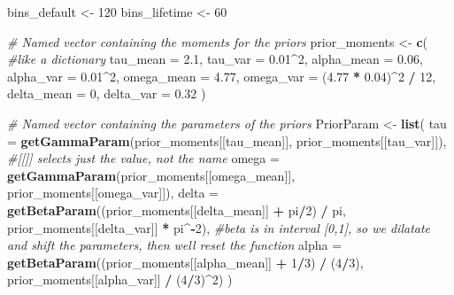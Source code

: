 \documentclass[
]{article}
\newenvironment{Shaded}{\begin{snugshade}}{\end{snugshade}}
\newcommand{\AttributeTok}[1]{\textcolor[rgb]{0.13,0.29,0.53}{#1}}
\newcommand{\CommentTok}[1]{\textcolor[rgb]{0.56,0.35,0.01}{\textit{#1}}}
\newcommand{\DecValTok}[1]{\textcolor[rgb]{0.00,0.00,0.81}{#1}}
\newcommand{\FloatTok}[1]{\textcolor[rgb]{0.00,0.00,0.81}{#1}}
\newcommand{\FunctionTok}[1]{\textcolor[rgb]{0.13,0.29,0.53}{\textbf{#1}}}
\newcommand{\NormalTok}[1]{#1}
\newcommand{\OtherTok}[1]{\textcolor[rgb]{0.56,0.35,0.01}{#1}}
\newcommand{\SpecialCharTok}[1]{\textcolor[rgb]{0.81,0.36,0.00}{\textbf{#1}}}
\newcommand{\StringTok}[1]{\textcolor[rgb]{0.31,0.60,0.02}{#1}}
\begin{document}
\begin{Shaded}
\begin{Highlighting}[]
\NormalTok{bins\_default }\OtherTok{\textless{}{-}} \DecValTok{120}
\NormalTok{bins\_lifetime }\OtherTok{\textless{}{-}} \DecValTok{60}

\CommentTok{\# Named vector containing the moments for the priors}
\NormalTok{prior\_moments }\OtherTok{\textless{}{-}} \FunctionTok{c}\NormalTok{( }\CommentTok{\#like a dictionary}
  \AttributeTok{tau\_mean =} \FloatTok{2.1}\NormalTok{,    }\AttributeTok{tau\_var =} \FloatTok{0.01}\SpecialCharTok{\^{}}\DecValTok{2}\NormalTok{,}
  \AttributeTok{alpha\_mean =} \FloatTok{0.06}\NormalTok{,  }\AttributeTok{alpha\_var =} \FloatTok{0.01}\SpecialCharTok{\^{}}\DecValTok{2}\NormalTok{,}
  \AttributeTok{omega\_mean =} \FloatTok{4.77}\NormalTok{, }\AttributeTok{omega\_var =}\NormalTok{ (}\FloatTok{4.77} \SpecialCharTok{*} \FloatTok{0.04}\NormalTok{)}\SpecialCharTok{\^{}}\DecValTok{2} \SpecialCharTok{/} \DecValTok{12}\NormalTok{,}
  \AttributeTok{delta\_mean =} \DecValTok{0}\NormalTok{,    }\AttributeTok{delta\_var =} \FloatTok{0.32}
\NormalTok{)}

\CommentTok{\# Named vector containing the parameters of the priors}
\NormalTok{PriorParam }\OtherTok{\textless{}{-}} \FunctionTok{list}\NormalTok{(}
  \AttributeTok{tau =} \FunctionTok{getGammaParam}\NormalTok{(prior\_moments[[}\StringTok{\textquotesingle{}tau\_mean\textquotesingle{}}\NormalTok{]], prior\_moments[[}\StringTok{\textquotesingle{}tau\_var\textquotesingle{}}\NormalTok{]]),        }\CommentTok{\#[[]] selects just the value, not the name}
  \AttributeTok{omega =} \FunctionTok{getGammaParam}\NormalTok{(prior\_moments[[}\StringTok{\textquotesingle{}omega\_mean\textquotesingle{}}\NormalTok{]], prior\_moments[[}\StringTok{\textquotesingle{}omega\_var\textquotesingle{}}\NormalTok{]]),}
  \AttributeTok{delta =} \FunctionTok{getBetaParam}\NormalTok{((prior\_moments[[}\StringTok{\textquotesingle{}delta\_mean\textquotesingle{}}\NormalTok{]] }\SpecialCharTok{+}\NormalTok{ pi}\SpecialCharTok{/}\DecValTok{2}\NormalTok{) }\SpecialCharTok{/}\NormalTok{ pi, prior\_moments[[}\StringTok{\textquotesingle{}delta\_var\textquotesingle{}}\NormalTok{]] }\SpecialCharTok{*}\NormalTok{ pi}\SpecialCharTok{\^{}{-}}\DecValTok{2}\NormalTok{), }\CommentTok{\#beta is in interval [0,1], so we dilatate and shift the parameters, then we\textquotesingle{}ll reset the function}
  \AttributeTok{alpha =} \FunctionTok{getBetaParam}\NormalTok{((prior\_moments[[}\StringTok{\textquotesingle{}alpha\_mean\textquotesingle{}}\NormalTok{]] }\SpecialCharTok{+} \DecValTok{1}\SpecialCharTok{/}\DecValTok{3}\NormalTok{) }\SpecialCharTok{/}\NormalTok{ (}\DecValTok{4}\SpecialCharTok{/}\DecValTok{3}\NormalTok{), prior\_moments[[}\StringTok{\textquotesingle{}alpha\_var\textquotesingle{}}\NormalTok{]] }\SpecialCharTok{/}\NormalTok{ (}\DecValTok{4}\SpecialCharTok{/}\DecValTok{3}\NormalTok{)}\SpecialCharTok{\^{}}\DecValTok{2}\NormalTok{)}
\NormalTok{)}
\end{Highlighting}
\end{Shaded}
\end{document}
